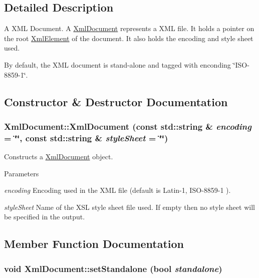 \subsection{Detailed Description}
A XML Document. A \hyperlink{classXmlDocument}{XmlDocument} represents a XML file. It holds a pointer on the root \hyperlink{classXmlElement}{XmlElement} of the document. It also holds the encoding and style sheet used.

By default, the XML document is stand-\/alone and tagged with enconding \char`\"{}ISO-\/8859-\/1\char`\"{}. 

\subsection{Constructor \& Destructor Documentation}
\hypertarget{classXmlDocument_a3bc4c5ea5f22b4ff8776422125b31d42}{
\subsubsection[{XmlDocument}]{\setlength{\rightskip}{0pt plus 5cm}XmlDocument::XmlDocument (const std::string \& {\em encoding} = {\ttfamily \char`\"{}\char`\"{}}, \/  const std::string \& {\em styleSheet} = {\ttfamily \char`\"{}\char`\"{}})}}
\label{classXmlDocument_a3bc4c5ea5f22b4ff8776422125b31d42}


Constructs a \hyperlink{classXmlDocument}{XmlDocument} object. 


\begin{DoxyParams}{Parameters}
\item[{\em encoding}]Encoding used in the XML file (default is Latin-\/1, ISO-\/8859-\/1 ). \item[{\em styleSheet}]Name of the XSL style sheet file used. If empty then no style sheet will be specified in the output. \end{DoxyParams}


\subsection{Member Function Documentation}
\hypertarget{classXmlDocument_a3cc9d3452daba0bda758ee7add075827}{
\subsubsection[{setStandalone}]{\setlength{\rightskip}{0pt plus 5cm}void XmlDocument::setStandalone (bool {\em standalone})}}
\label{classXmlDocument_a3cc9d3452daba0bda758ee7add075827}


